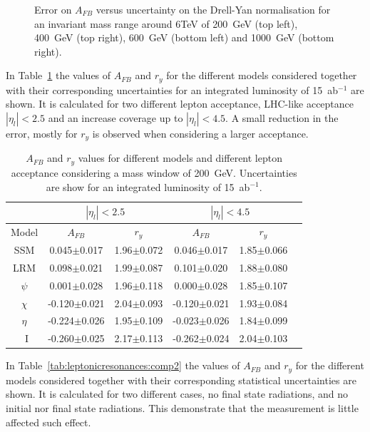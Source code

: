 \begin{figure}[!htb]
  \caption{Error on $A_{FB}$ versus uncertainty on the Drell-Yan normalisation for an invariant mass range around 6TeV of 200~GeV (top left),  400~GeV (top right), 600~GeV (bottom left) and 1000~GeV (bottom right).}
  \label{figure:lepana:afb_bgerr}
\end{figure}

\noindent In Table~\ref{tab:leptonicresonances:comp1} the values of $A_{FB}$ and $r_y$ for the different models considered together with their corresponding uncertainties for an integrated luminosity of 15~ab$^{-1}$ are shown. 
It is calculated for two different lepton acceptance, LHC-like acceptance $|\eta_l|<2.5$ and an increase coverage up to $|\eta_l|<4.5$. A small reduction in the error, mostly for $r_y$ is observed when considering a larger acceptance.

\begin{table}
\centering
\begin{tabular}{| c | c | c | c | c | c | |} \hline\hline
 & \multicolumn{2}{c|}{$|\eta_l|<2.5$}  & \multicolumn{2}{c|}{$|\eta_l|<4.5$} \\

\hline
  Model &  $A_{FB}$            &  $r_y$                  &  $A_{FB}$             &  $r_y$                 \\
\hline
SSM    &  0.045$\pm$0.017 & 1.96$\pm$0.072  & 0.046$\pm$0.017 & 1.85$\pm$0.066   \\
LRM    &  0.098$\pm$0.021 & 1.99$\pm$0.087  & 0.101$\pm$0.020 & 1.88$\pm$0.080   \\
$\psi$  &  0.001$\pm$0.028  & 1.96$\pm$0.118 & 0.000$\pm$0.028 & 1.85$\pm$0.107    \\
$\chi$  & -0.120$\pm$0.021  & 2.04$\pm$0.093 & -0.120$\pm$0.021 & 1.93$\pm$0.084   \\
$\eta$  & -0.224$\pm$0.026  & 1.95$\pm$0.109 & -0.023$\pm$0.026 & 1.84$\pm$0.099   \\
~I         & -0.260$\pm$0.025 & 2.17$\pm$0.113  & -0.262$\pm$0.024 & 2.04$\pm$0.103   \\
\hline\hline
\end{tabular}
\caption{$A_{FB}$ and $r_y$ values for different models and different lepton acceptance considering a mass window of 200~GeV. Uncertainties are show for an integrated luminosity of 15~ab$^{-1}$.}
\label{tab:leptonicresonances:comp1}
\end{table}

\noindent In Table~\ref{tab:leptonicresonances:comp2} the values of $A_{FB}$ and $r_y$ for the different models considered together with their corresponding statistical uncertainties are shown. 
It is calculated for two different cases, no final state radiations, and no initial nor final state radiations. This demonstrate that the measurement is little affected such effect.

